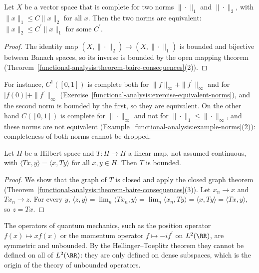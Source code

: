 \begin{corollary}\label{functional-analysis:corollary-equivalent-norms}
Let $X$ be a vector space that is complete for two norms $\|\cdot\|_1$ and $\|\cdot\|_2$, with $\|x\|_1 \leq C\|x\|_2$ for all $x$. Then the two norms are equivalent: $\|x\|_2 \leq C^{\prime}\|x\|_1$ for some
$C^{\prime}$.
\end{corollary}

\begin{proof}
The identity map $(X, \|\cdot\|_2) \to (X, \|\cdot\|_1)$ is bounded and bijective between Banach spaces, so its inverse is bounded by the open mapping theorem
(Theorem~\ref{functional-analysis:theorem-baire-consequences}(2)).
\end{proof}

For instance, $C^1([0, 1])$ is complete both for $\|f\|_\infty + \|f^{\prime}\|_\infty$ and for $|f(0)| + \|f^{\prime}\|_\infty$ (Exercise~\ref{functional-analysis:exercise-equivalent-norms}), and the second norm is
bounded by the first, so they are equivalent. On the other hand $C([0, 1])$ is complete for $\|\cdot\|_\infty$ and not for $\|\cdot\|_1 \leq \|\cdot\|_\infty$, and these norms are not equivalent
(Example~\ref{functional-analysis:example-norms}(2)): completeness of both norms cannot be dropped.

\begin{corollary}\label{functional-analysis:corollary-hellinger-toeplitz}
Let $H$ be a Hilbert space and $T \colon H \to H$ a linear map, not assumed continuous, with $\langle Tx, y \rangle = \langle x, Ty \rangle$ for all $x, y \in H$. Then $T$ is bounded.
\end{corollary}

\begin{proof}
We show that the graph of $T$ is closed and apply the closed graph theorem (Theorem~\ref{functional-analysis:theorem-baire-consequences}(3)). Let $x_n \to x$ and $Tx_n \to z$. For every $y$,
$\langle z, y \rangle = \lim_n\langle Tx_n, y \rangle = \lim_n\langle x_n, Ty \rangle = \langle x, Ty \rangle = \langle Tx, y \rangle$, so $z = Tx$.
\end{proof}

The operators of quantum mechanics, such as the position operator $f(x) \mapsto xf(x)$ or the momentum operator $f \mapsto -i f^{\prime}$ on $L^2(\RR)$, are symmetric and unbounded. By the
Hellinger--Toeplitz theorem they cannot be defined on all of $L^2(\RR)$: they are only defined on dense subspaces, which is the origin of the theory of unbounded operators.

